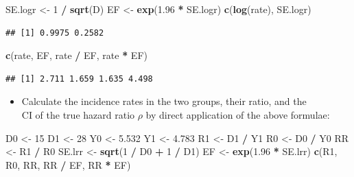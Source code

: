 \documentclass[
]{book}
\newenvironment{Shaded}{\begin{snugshade}}{\end{snugshade}}
\newcommand{\DecValTok}[1]{\textcolor[rgb]{0.00,0.00,0.81}{#1}}
\newcommand{\FloatTok}[1]{\textcolor[rgb]{0.00,0.00,0.81}{#1}}
\newcommand{\FunctionTok}[1]{\textcolor[rgb]{0.13,0.29,0.53}{\textbf{#1}}}
\newcommand{\NormalTok}[1]{#1}
\newcommand{\OtherTok}[1]{\textcolor[rgb]{0.56,0.35,0.01}{#1}}
\newcommand{\SpecialCharTok}[1]{\textcolor[rgb]{0.81,0.36,0.00}{\textbf{#1}}}
\providecommand{\tightlist}{%
  \setlength{\itemsep}{0pt}\setlength{\parskip}{0pt}}
\theoremstyle{definition}
\theoremstyle{definition}
\theoremstyle{definition}
\theoremstyle{definition}
\theoremstyle{remark}
\begin{document}
\begin{Shaded}
\begin{Highlighting}[]
\NormalTok{SE.logr }\OtherTok{\textless{}{-}} \DecValTok{1} \SpecialCharTok{/} \FunctionTok{sqrt}\NormalTok{(D)}
\NormalTok{EF }\OtherTok{\textless{}{-}} \FunctionTok{exp}\NormalTok{(}\FloatTok{1.96} \SpecialCharTok{*}\NormalTok{ SE.logr)}
\FunctionTok{c}\NormalTok{(}\FunctionTok{log}\NormalTok{(rate), SE.logr)}
\end{Highlighting}
\end{Shaded}

\begin{verbatim}
## [1] 0.9975 0.2582
\end{verbatim}

\begin{Shaded}
\begin{Highlighting}[]
\FunctionTok{c}\NormalTok{(rate, EF, rate }\SpecialCharTok{/}\NormalTok{ EF, rate }\SpecialCharTok{*}\NormalTok{ EF)}
\end{Highlighting}
\end{Shaded}

\begin{verbatim}
## [1] 2.711 1.659 1.635 4.498
\end{verbatim}

\begin{itemize}
\tightlist
\item
  Calculate the incidence rates in the two groups, their ratio, and the\\
  CI of the true hazard ratio \(\rho\) by direct application of the above formulae:
\end{itemize}

\begin{Shaded}
\begin{Highlighting}[]
\NormalTok{D0 }\OtherTok{\textless{}{-}} \DecValTok{15}
\NormalTok{D1 }\OtherTok{\textless{}{-}} \DecValTok{28}
\NormalTok{Y0 }\OtherTok{\textless{}{-}} \FloatTok{5.532}
\NormalTok{Y1 }\OtherTok{\textless{}{-}} \FloatTok{4.783}
\NormalTok{R1 }\OtherTok{\textless{}{-}}\NormalTok{ D1 }\SpecialCharTok{/}\NormalTok{ Y1}
\NormalTok{R0 }\OtherTok{\textless{}{-}}\NormalTok{ D0 }\SpecialCharTok{/}\NormalTok{ Y0}
\NormalTok{RR }\OtherTok{\textless{}{-}}\NormalTok{ R1 }\SpecialCharTok{/}\NormalTok{ R0}
\NormalTok{SE.lrr }\OtherTok{\textless{}{-}} \FunctionTok{sqrt}\NormalTok{(}\DecValTok{1} \SpecialCharTok{/}\NormalTok{ D0 }\SpecialCharTok{+} \DecValTok{1} \SpecialCharTok{/}\NormalTok{ D1)}
\NormalTok{EF }\OtherTok{\textless{}{-}} \FunctionTok{exp}\NormalTok{(}\FloatTok{1.96} \SpecialCharTok{*}\NormalTok{ SE.lrr)}
\FunctionTok{c}\NormalTok{(R1, R0, RR, RR }\SpecialCharTok{/}\NormalTok{ EF, RR }\SpecialCharTok{*}\NormalTok{ EF)}
\end{Highlighting}
\end{Shaded}
\end{document}
